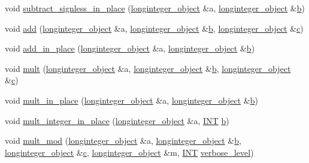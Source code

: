 \begin{DoxyCompactItemize}
\item 
void \mbox{\hyperlink{classlonginteger__domain_ac3a5c472a3dfa53ce08843fbbf7150c2}{subtract\+\_\+signless\+\_\+in\+\_\+place}} (\mbox{\hyperlink{classlonginteger__object}{longinteger\+\_\+object}} \&a, \mbox{\hyperlink{classlonginteger__object}{longinteger\+\_\+object}} \&\mbox{\hyperlink{alphabet2_8_c_a148e3876077787926724625411d6e7a9}{b}})
\item 
void \mbox{\hyperlink{classlonginteger__domain_a2b9c10fbac79f7bbbbd65c7265cdc533}{add}} (\mbox{\hyperlink{classlonginteger__object}{longinteger\+\_\+object}} \&a, \mbox{\hyperlink{classlonginteger__object}{longinteger\+\_\+object}} \&\mbox{\hyperlink{alphabet2_8_c_a148e3876077787926724625411d6e7a9}{b}}, \mbox{\hyperlink{classlonginteger__object}{longinteger\+\_\+object}} \&\mbox{\hyperlink{alphabet2_8_c_a4e1e0e72dd773439e333c84dd762a9c3}{c}})
\item 
void \mbox{\hyperlink{classlonginteger__domain_af988798167147a39b87584b622442eef}{add\+\_\+in\+\_\+place}} (\mbox{\hyperlink{classlonginteger__object}{longinteger\+\_\+object}} \&a, \mbox{\hyperlink{classlonginteger__object}{longinteger\+\_\+object}} \&\mbox{\hyperlink{alphabet2_8_c_a148e3876077787926724625411d6e7a9}{b}})
\item 
void \mbox{\hyperlink{classlonginteger__domain_add02b012364cf88ba81d81930b284c35}{mult}} (\mbox{\hyperlink{classlonginteger__object}{longinteger\+\_\+object}} \&a, \mbox{\hyperlink{classlonginteger__object}{longinteger\+\_\+object}} \&\mbox{\hyperlink{alphabet2_8_c_a148e3876077787926724625411d6e7a9}{b}}, \mbox{\hyperlink{classlonginteger__object}{longinteger\+\_\+object}} \&\mbox{\hyperlink{alphabet2_8_c_a4e1e0e72dd773439e333c84dd762a9c3}{c}})
\item 
void \mbox{\hyperlink{classlonginteger__domain_a999f4469b82a86e12b45a39fe7c0074d}{mult\+\_\+in\+\_\+place}} (\mbox{\hyperlink{classlonginteger__object}{longinteger\+\_\+object}} \&a, \mbox{\hyperlink{classlonginteger__object}{longinteger\+\_\+object}} \&\mbox{\hyperlink{alphabet2_8_c_a148e3876077787926724625411d6e7a9}{b}})
\item 
void \mbox{\hyperlink{classlonginteger__domain_a02a15ae41f4c5a6144267a1bbdafe038}{mult\+\_\+integer\+\_\+in\+\_\+place}} (\mbox{\hyperlink{classlonginteger__object}{longinteger\+\_\+object}} \&a, \mbox{\hyperlink{galois_8h_a09fddde158a3a20bd2dcadb609de11dc}{I\+NT}} \mbox{\hyperlink{alphabet2_8_c_a148e3876077787926724625411d6e7a9}{b}})
\item 
void \mbox{\hyperlink{classlonginteger__domain_aca5463c0638b878951502ec9c5f811da}{mult\+\_\+mod}} (\mbox{\hyperlink{classlonginteger__object}{longinteger\+\_\+object}} \&a, \mbox{\hyperlink{classlonginteger__object}{longinteger\+\_\+object}} \&\mbox{\hyperlink{alphabet2_8_c_a148e3876077787926724625411d6e7a9}{b}}, \mbox{\hyperlink{classlonginteger__object}{longinteger\+\_\+object}} \&\mbox{\hyperlink{alphabet2_8_c_a4e1e0e72dd773439e333c84dd762a9c3}{c}}, \mbox{\hyperlink{classlonginteger__object}{longinteger\+\_\+object}} \&m, \mbox{\hyperlink{galois_8h_a09fddde158a3a20bd2dcadb609de11dc}{I\+NT}} \mbox{\hyperlink{simeon_8_c_a818073fbcc2f439e7c56952f67386122}{verbose\+\_\+level}})

\end{DoxyCompactItemize}
